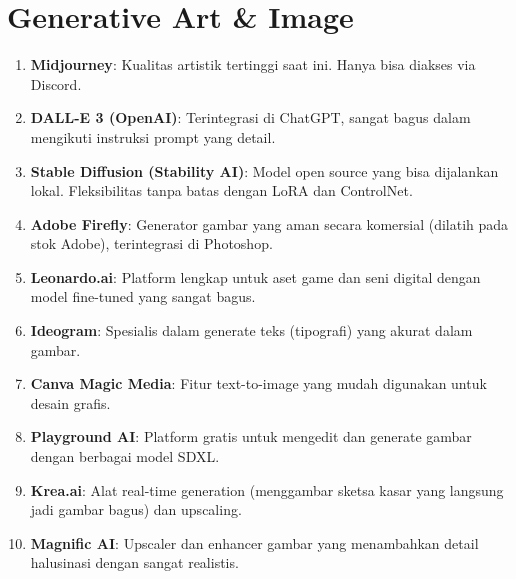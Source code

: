 \section{Generative Art \& Image}
\begin{enumerate}
    \item \textbf{Midjourney}: Kualitas artistik tertinggi saat ini. Hanya bisa diakses via Discord.
    \item \textbf{DALL-E 3 (OpenAI)}: Terintegrasi di ChatGPT, sangat bagus dalam mengikuti instruksi prompt yang detail.
    \item \textbf{Stable Diffusion (Stability AI)}: Model open source yang bisa dijalankan lokal. Fleksibilitas tanpa batas dengan LoRA dan ControlNet.
    \item \textbf{Adobe Firefly}: Generator gambar yang aman secara komersial (dilatih pada stok Adobe), terintegrasi di Photoshop.
    \item \textbf{Leonardo.ai}: Platform lengkap untuk aset game dan seni digital dengan model fine-tuned yang sangat bagus.
    \item \textbf{Ideogram}: Spesialis dalam generate teks (tipografi) yang akurat dalam gambar.
    \item \textbf{Canva Magic Media}: Fitur text-to-image yang mudah digunakan untuk desain grafis.
    \item \textbf{Playground AI}: Platform gratis untuk mengedit dan generate gambar dengan berbagai model SDXL.
    \item \textbf{Krea.ai}: Alat real-time generation (menggambar sketsa kasar yang langsung jadi gambar bagus) dan upscaling.
    \item \textbf{Magnific AI}: Upscaler dan enhancer gambar yang menambahkan detail halusinasi dengan sangat realistis.
\end{enumerate}

